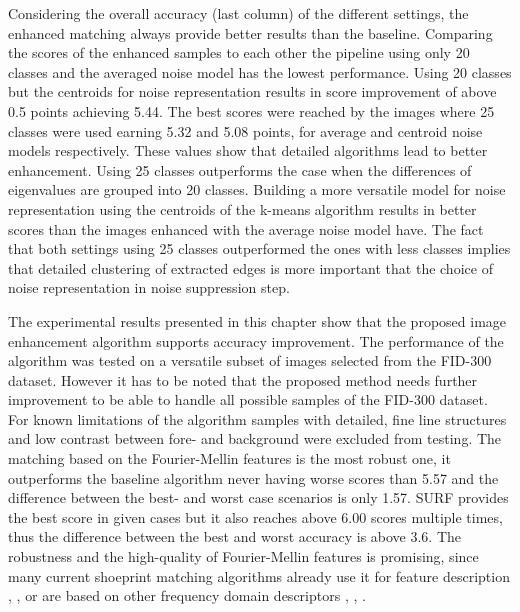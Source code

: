 \documentclass[draft,final]{vutinfth} %
\begin{document}
\par
Considering the overall accuracy (last column) of the different settings, the enhanced matching always provide better results than the baseline.
Comparing the scores of the enhanced samples to each other the pipeline using only 20 classes and the averaged noise model has the lowest performance.
Using 20 classes but the centroids for noise representation results in score improvement of above 0.5 points achieving 5.44.
The best scores were reached by the images where 25 classes were used earning 5.32 and 5.08 points, for average and centroid noise models respectively.
These values show that detailed algorithms lead to better enhancement.
Using 25 classes outperforms the case when the differences of eigenvalues are grouped into 20 classes.
Building a more versatile model for noise representation using the centroids of the k-means algorithm results in better scores than the images enhanced with the average noise model have.
The fact that both settings using 25 classes outperformed the ones with less classes implies that detailed clustering of extracted edges is more important that the  choice of noise representation in noise suppression step.

\par
The experimental results presented in this chapter show that the proposed image enhancement algorithm supports accuracy improvement.
The performance of the algorithm was tested on a versatile subset of images selected from the FID-300 dataset.
However it has to be noted that the proposed method needs further improvement to be able to handle all possible samples of the FID-300 dataset.
For known limitations of the algorithm samples with detailed, fine line structures and low contrast between fore- and background were excluded from testing.
The matching based on the Fourier-Mellin features is the most robust one, it outperforms the baseline algorithm never having worse scores than 5.57 and the difference between the best- and worst case scenarios is only 1.57.
SURF provides the best score in given cases but it also reaches above 6.00 scores multiple times, thus the difference between the best and worst accuracy is above 3.6.
The robustness and the high-quality of Fourier-Mellin features is promising, since many current shoeprint matching algorithms already use it for feature description  \cite{gueham2008automatic}, \cite{richetelli2017classification}, \cite{wu2019crime} or are based on other frequency domain descriptors \cite{algarni2008novel}, \cite{wang2014automatic}, \cite{katireddy2017novel}.
\end{document}
